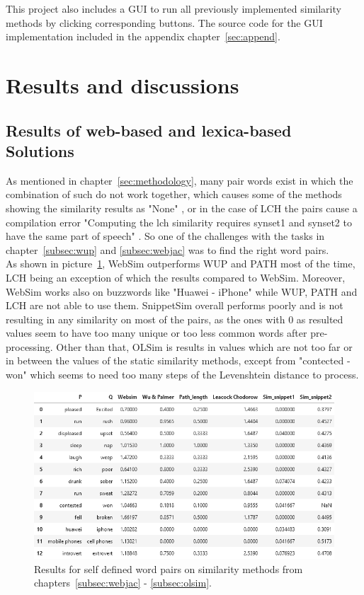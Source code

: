 \documentclass[conference]{IEEEtran}
\begin{document}
This project also includes a GUI to run all previously implemented similarity methods by clicking corresponding buttons. The source code for the GUI implementation included in the appendix chapter~\ref{sec:append}.

\section{Results and discussions}\label{sec:results}

\subsection{Results of web-based and lexica-based Solutions}

As mentioned in chapter~\ref{sec:methodology}, many pair words exist in which the combination of such do not work together, which causes some of the methods showing the similarity results as "None" \cite{perkins}, or in the case of LCH the pairs cause a compilation error "Computing the lch similarity requires synset1 and synset2 to have the same part of speech" \cite{nltkwordnet}. So one of the challenges with the tasks in chapter~\ref{subsec:wup} and \ref{subsec:webjac} was to find the right word pairs.\\
As shown in picture~\ref{fig:simtable}, WebSim outperforms WUP and PATH most of the time, LCH being an exception of which the results compared to WebSim. Moreover, WebSim works also on buzzwords like "Huawei - iPhone" while WUP, PATH and LCH are not able to use them. SnippetSim overall performs poorly and is not resulting in any similarity on most of the pairs, as the ones with 0 as resulted values seem to have too many unique or too less common words after pre-processing. Other than that, OLSim is results in values which are not too far or in between the values of the static similarity methods, except from "contected - won" which seems to need too many  steps of the Levenshtein distance to process.

\begin{figure}[h]
\centerline{\includegraphics[scale=0.5]{img/table.png}}
\caption{Results for self defined word pairs on similarity methods from chapters~\ref{subsec:webjac} - \ref{subsec:olsim}.}
\label{fig:simtable}
\end{figure}
\end{document}
